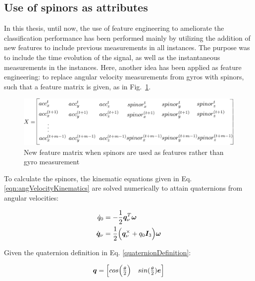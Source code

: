 \subsection{Use of spinors as attributes}
In this thesis, until now, the use of feature engineering to ameliorate the classification performance has been performed mainly by utilizing the addition of new features to include previous measurements in all instances. The purpose was to include the time evolution of the signal, as well as the instantaneous measurements in the instances. Here, another idea has been applied as feature engineering: to replace angular velocity measurements from gyros with spinors, such that a feature matrix is given, as in Fig.~\ref{fig:featureMatrixSpinors}. 

\begin{figure}[h]
\begin{center}
\includegraphics[width=13cm]{figures/featureMatrixSpinors}    %
\caption{New feature matrix when spinors are used as features rather than gyro measurement} 
\label{fig:featureMatrixSpinors}
\end{center}
\end{figure}

To calculate the spinors, the kinematic equations given in Eq. \ref{eqn:angVelocityKinematics} are solved numerically to attain quaternions from angular velocities:


\begin{align}{\label{eqn:angVelocityKinematics}}
\begin{split}
 \dot{q}_0 &= -\frac{1}{2} \bm{q}_\nu^T \bm{\omega}\\
 \dot{\bm{q}}_\nu &= \frac{1}{2}\Big(\bm{q}_\nu^\times + q_0 \bm{I}_3 \Big) \bm{\omega} \\
\end{split}
\end{align}

Given the quaternion definition in  Eq. \ref{quaternionDefinition}:

\begin{equation}{\label{quaternionDefinition}}
\bm{q} = \begin{bmatrix} 
cos\Big(\frac{\theta}{2}\Big) & sin(\frac{\theta}{2}) \bm{e} \\
\end{bmatrix}
\end{equation}

